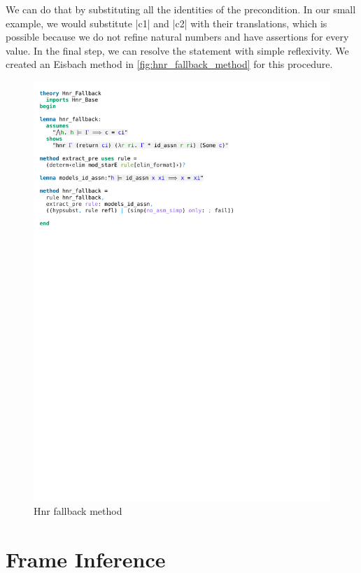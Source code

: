 \noindent We can do that by substituting all the identities of the precondition. In our small example, we would substitute |c1| and |c2| with their translations, which is possible because we do not refine natural numbers and have assertions for every value.
In the final step, we can resolve the statement with simple reflexivity. We created an Eisbach method in \autoref{fig:hnr_fallback_method} for this procedure.

\begin{figure}[htpb]
    \includegraphics[trim={0 20,2cm 0 5,2cm}, clip, width=1.00\textwidth]{figures/Theory_Hnr_Fallback.pdf}
    \caption[Hnr fallback method]{Hnr fallback method}
    \label{fig:hnr_fallback_method}
\end{figure}

\section{Frame Inference}

